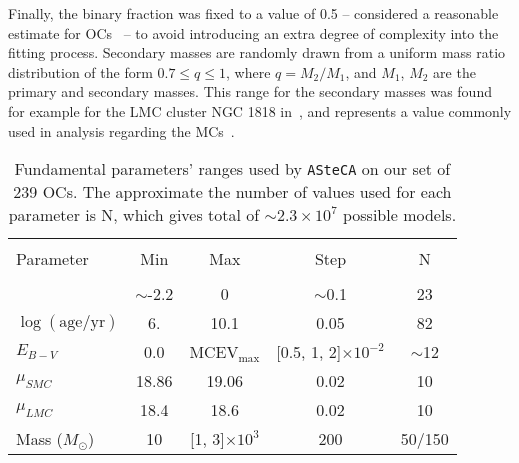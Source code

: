 \documentclass[a4paper,fleqn,usenatbib]{mnras}
\begin{document}
Finally, the binary fraction was fixed to a value of 0.5 -- considered a
reasonable estimate for OCs~\citep{von_Hippel_2005,Sollima_2010} -- to avoid
introducing an extra degree of complexity into the fitting process. Secondary
masses are randomly drawn from a uniform mass ratio distribution of the form
$0.7{\le}q{\le}1$, where $q{=}M_2/M_1$, and $M_1$, $M_2$ are the primary and
secondary masses. This range for the secondary masses was found for example for
the LMC cluster NGC 1818 in~\cite{Elson_1998}, and represents a value commonly
used in analysis regarding the
MCs~\citep[see][and references therein]{Rubele_2011}.

\begin{table}
\centering
\caption{Fundamental parameters' ranges used by \texttt{ASteCA} on our set
of 239 OCs. The approximate the number of values used for each parameter is N,
which gives total of $\sim2.3 {\times}10^7$ possible models.}
\label{tab:ga-range}
\begin{tabular}{lcccc}
\hline
\hline\\[-1.85ex]
 Parameter & Min & Max & Step & N\\
\hline\\[-1.85ex]
[Fe/H] & $\sim$-2.2 & 0 & $\sim$0.1 & 23\\
$\log\mathrm{(age/yr)}$ & 6. & 10.1 & 0.05 & 82\\
$E_{B-V}$ & 0.0 & MCEV$_{\max}$ & [0.5, 1, 2]${\times}10^{-2}$ & $\sim$12\\
$\mu_{SMC}$ & 18.86 & 19.06 & 0.02 & 10\\
$\mu_{LMC}$ & 18.4 & 18.6 & 0.02 & 10\\
Mass ($M_{\odot}$) & 10 & [1, 3]${\times}10^{3}$ & 200 & 50/150\\
\hline
\end{tabular}
\end{table}
\end{document}
